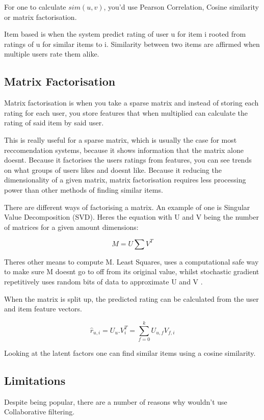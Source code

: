 For one to calculate $sim(u , v)$, you'd use Pearson Correlation, Cosine similarity or matrix factorisation.

Item based is when the system predict rating of user u for item i rooted from ratings of u for similar items to i. Similarity between two items are affirmed when multiple users rate them alike.

\subsection{Matrix Factorisation}

Matrix factorisation is when you take a sparse matrix and instead of storing each rating for each user, you store features that when multiplied can calculate the rating of said item by said user.

This is really useful for a sparse matrix, which is usually the case for most reccomendation systems, because it shows information that the matrix alone doesnt. Because it factorises the users ratings from features, you can see trends on what groups of users likes and doesnt like. Because it reducing the dimensionality of a given matrix, matrix factorisation requires less processing power than other methods of finding similar items. 

There are different ways of factorising a matrix. An example of one is Singular Value Decomposition (SVD). Heres the equation with U and V being the number of matrices for a given amount dimensions:

\begin{equation}
	M = U \sum V ^{T}
\end{equation}

Theres other means to compute M. Least Squares, uses a computational safe way to make sure M doesnt go to off from its original value, whilst stochastic gradient repetitively uses random bits of data to approximate U and V \citep{koren_matrix_2009}. 

When the matrix is split up, the predicted rating can be calculated from the user and item feature vectors. 

\begin{equation}
	\hat{r} _{u,i} = U _{u} . V _{i}^{T} = \sum_{f=0}^{k} U_{u,f} V_{f, i}
\end{equation}

Looking at the latent factors one can find  similar items using a cosine similarity.

\subsection{Limitations}
Despite being popular, there are a number of reasons why wouldn't use Collaborative filtering.

